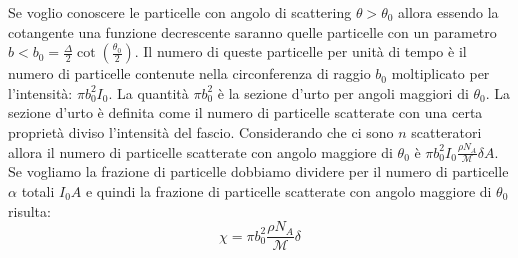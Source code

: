 Se voglio conoscere le particelle con angolo di scattering $\theta>\theta_0$ allora essendo la cotangente una funzione decrescente saranno quelle particelle con un parametro $b<b_0=\frac{\Delta}{2}\cot\left(\frac{\theta_0}{2}\right)$. Il numero di queste particelle per unità di tempo è il numero di particelle contenute nella circonferenza di raggio $b_0$ moltiplicato per l'intensità: $\pi b_0^2I_0$. La quantità $\pi b_0^2$ è la sezione d'urto per angoli maggiori di $\theta_0$. La sezione d'urto è definita come il numero di particelle scatterate con una certa proprietà diviso l'intensità del fascio. Considerando che ci sono $n$ scatteratori allora il numero di particelle scatterate con angolo maggiore di $\theta_0$ è $\pi b_0^2I_0\frac{\rho N_A}{\mathcal{M}}\delta A$. Se vogliamo la frazione di particelle dobbiamo dividere per il numero di particelle $\alpha$ totali $I_0A$ e quindi la frazione di particelle scatterate con angolo maggiore di $\theta_0$ risulta:
\begin{equation}
	\chi=\pi b_0^2\frac{\rho N_A}{\mathcal{M}}\delta
\end{equation}
